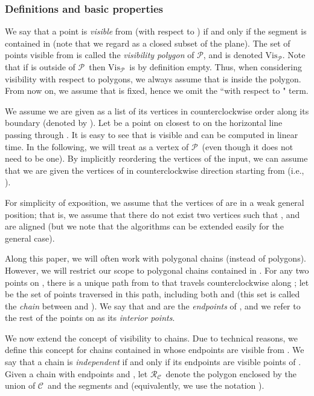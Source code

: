 \documentclass[a4paper]{article}
\newcommand{\Poly}{\ensuremath{\mathcal{P}}}               \newcommand{\bd}{\ensuremath{\partial \Poly} }                 \newcommand{\Vis}{\ensuremath{\mathrm{Vis}_\Poly}} \newcommand{\VisC}{\ensuremath{\mathrm{Vis}_{\mathcal{C}}}} \newcommand{\VisCprime}{\ensuremath{\mathrm{Vis}_{\mathcal{C'}}}} \newcommand{\E}{\ensuremath{\mathrm{E}}}                    \newcommand{\Rin}{\ensuremath{r}}      \newcommand{\Rout}{\ensuremath{\bar{r}}}      \newcommand{\Hout}{\ensuremath{\bar{h}}}      \newcommand{\chain}{\ensuremath{{\mathrm{Chain}}}}     \newcommand{\region}{\ensuremath{{{\mathcal R}}}}
\newcommand{\regionC}{\ensuremath{{{\mathcal R_{\mathcal C}}}}}
\newcommand{\C}{\ensuremath{{\mathcal C}}}
\begin{document}
\subsubsection*{Definitions and basic properties}
We say that a point  is \emph{visible} from  (with respect to ) if and only if the segment  is contained in  (note that we regard  as a closed subset of the plane). The set of points visible from  is called the \emph{visibility polygon} of \Poly, and is denoted \Vis. Note that if  is outside of \Poly\ then \Vis\ is by definition empty. Thus, when considering visibility with respect to polygons, we always assume that  is inside the polygon. From now on, we assume that  is fixed, hence we omit the ``with respect to " term.

We assume we are given  as a list of its vertices in counterclockwise order along its boundary (denoted by ). Let  be a point on  closest to  on the horizontal line passing through . It is easy to see that  is visible and can be computed in linear time. In the following, we will treat  as a vertex of \Poly\ (even though it does not need to be one). By implicitly reordering the vertices of the input, we can assume that we are given the vertices of  in counterclockwise direction starting from  (i.e., ). 

For simplicity of exposition, we assume that the vertices of  are in a weak general position; that is, we assume that there do not exist two vertices  such that , and  are aligned (but we note that the algorithms can be extended easily for the general case). 


Along this paper, we will often work with polygonal chains (instead of polygons). However, we will restrict our scope to polygonal chains contained in . For any two points  on , there is a unique path from  to  that travels counterclockwise along ; let  be the set of points traversed in this path, including both  and  (this set is called the {\em chain} between  and ). We say that  and  are the \emph{endpoints} of , and we refer to the rest of the points on  as its \emph{interior points}. 

We now extend the concept of visibility to chains. Due to technical reasons, we define this concept for chains contained in  whose endpoints are visible from .  We say that a chain  is \emph{independent} if and only if its endpoints are visible points of . Given a chain  with endpoints  and , let \regionC\ denote the polygon enclosed by the union of \C\ and the segments  and  (equivalently, we use the notation ).
\end{document}
